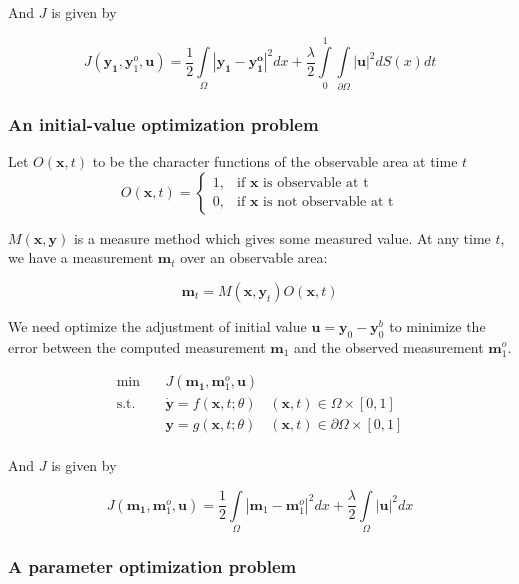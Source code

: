 \documentclass{article}
\begin{document}
And $ J $ is given by

$$
J(\mathbf{y_1}, \mathbf{y}_1^o, \mathbf{u}) = \frac{1}{2} \int\limits_{\Omega}|\mathbf{y_1} - \mathbf{y_1^o}|^2dx +  \frac{\lambda}{2} \int\limits_{0}^{1}\int\limits_{\partial \Omega} |\mathbf{u}|^2 dS(x) dt
$$

\subsubsection{An initial-value optimization problem}

Let $ O(\mathbf{x}, t) $ to be the character functions of the observable area at time $t$
$$
O(\mathbf{x}, t) = \begin{cases}
1, & \text{if }\mathbf{x}\text{ is observable at t} \\
0, & \text{if }\mathbf{x}\text{ is not observable at t}
\end{cases}
$$

$ M(\mathbf{x}, \mathbf{y}) $ is a measure method which gives some measured value. At any time $ t $, we have a measurement $\mathbf{m}_t$ over an observable area:

$$ \mathbf{m}_t = M(\mathbf{x}, \mathbf{y}_t) O(\mathbf{x}, t) $$

We need optimize the adjustment of initial value $ \mathbf{u} = \mathbf{y}_0 - \mathbf{y}_0^b $  to minimize the error between the computed measurement $ \mathbf{m}_1 $ and the observed measurement $ \mathbf{m}_1^o $.

$$
\begin{array}{rcll}
\min &~& J(\mathbf{m_1}, \mathbf{m}_1^o, \mathbf{u}) & \\
\mathrm{s.t.} &~& \dot{\mathbf{y}} = f(\mathbf{x}, t; \theta) & (\mathbf{x}, t) \in \Omega \times [0, 1] \\
&~& \mathbf{y} = g(\mathbf{x}, t; \theta) & (\mathbf{x}, t) \in \partial \Omega \times [0, 1] \\
\end{array}
$$

And $ J $ is given by

$$
J(\mathbf{m_1}, \mathbf{m}_1^o, \mathbf{u}) = \frac{1}{2} \int\limits_{\Omega}|\mathbf{m}_1 - \mathbf{m}_1^o|^2 dx + \frac{\lambda}{2} \int\limits_{\Omega}|\mathbf{u}|^2 dx
$$

\subsubsection{A parameter optimization problem}
\end{document}
